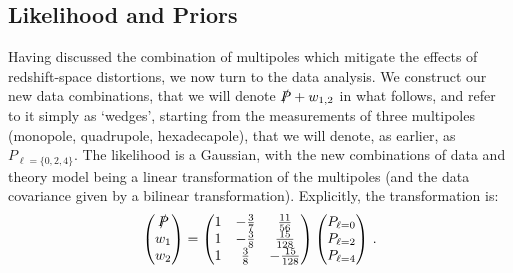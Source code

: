 \documentclass[12pt,a4paper]{article}
\def\PA{\slashed{P}}
\renewcommand{\(}{\left(}
\renewcommand{\)}{\right)}
\begin{document}
\subsection{Likelihood and Priors}\label{sec:lkl}
Having discussed the combination of multipoles which mitigate the effects of redshift-space distortions, we now turn to the data analysis.
We construct our new data combinations, that we will denote $\PA + w_{1,2}$ in what follows, and refer to it simply as `wedges', starting from the measurements of three multipoles (monopole, quadrupole, hexadecapole), that we will denote, as earlier, as $P_{\ell=\{0,2,4\}}$.   
The likelihood is a Gaussian, with the new combinations of data and theory model being a linear transformation of the multipoles (and the data covariance given by a bilinear transformation).
{Explicitly, the transformation is:
\begin{equation}
    \begin{pmatrix}
        \PA \\
        w_1 \\
        w_2
    \end{pmatrix} = 
    \begin{pmatrix}
        1 & -\frac{3}{7} & \frac{11}{56} \\
        1 & -\frac{3}{8} & \frac{15}{128} \\
        1 & \frac{3}{8} & - \frac{15}{128}
    \end{pmatrix}
    \begin{pmatrix}
        P_{\ell=0} \\
        P_{\ell=2} \\
        P_{\ell=4}
    \end{pmatrix} \, .
\end{equation}
}
\end{document}

